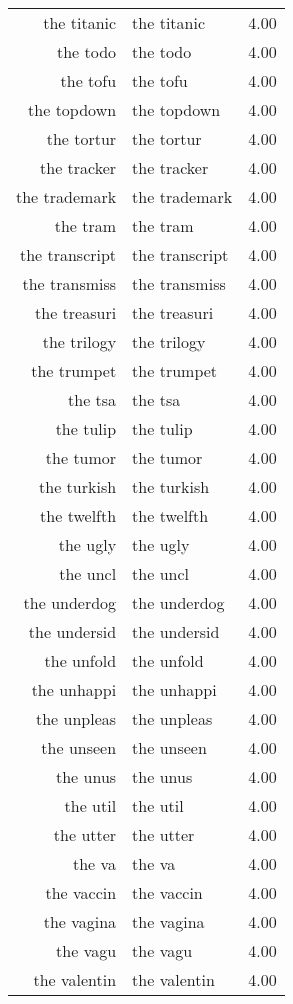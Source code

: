 \begin{table}[ht]
\begin{tabular}{rlr}
  the titanic & the titanic & 4.00 \\ 
  the todo & the todo & 4.00 \\ 
  the tofu & the tofu & 4.00 \\ 
  the topdown & the topdown & 4.00 \\ 
  the tortur & the tortur & 4.00 \\ 
  the tracker & the tracker & 4.00 \\ 
  the trademark & the trademark & 4.00 \\ 
  the tram & the tram & 4.00 \\ 
  the transcript & the transcript & 4.00 \\ 
  the transmiss & the transmiss & 4.00 \\ 
  the treasuri & the treasuri & 4.00 \\ 
  the trilogy & the trilogy & 4.00 \\ 
  the trumpet & the trumpet & 4.00 \\ 
  the tsa & the tsa & 4.00 \\ 
  the tulip & the tulip & 4.00 \\ 
  the tumor & the tumor & 4.00 \\ 
  the turkish & the turkish & 4.00 \\ 
  the twelfth & the twelfth & 4.00 \\ 
  the ugly & the ugly & 4.00 \\ 
  the uncl & the uncl & 4.00 \\ 
  the underdog & the underdog & 4.00 \\ 
  the undersid & the undersid & 4.00 \\ 
  the unfold & the unfold & 4.00 \\ 
  the unhappi & the unhappi & 4.00 \\ 
  the unpleas & the unpleas & 4.00 \\ 
  the unseen & the unseen & 4.00 \\ 
  the unus & the unus & 4.00 \\ 
  the util & the util & 4.00 \\ 
  the utter & the utter & 4.00 \\ 
  the va & the va & 4.00 \\ 
  the vaccin & the vaccin & 4.00 \\ 
  the vagina & the vagina & 4.00 \\ 
  the vagu & the vagu & 4.00 \\ 
  the valentin & the valentin & 4.00 \\ 

\end{tabular}
\end{table}
